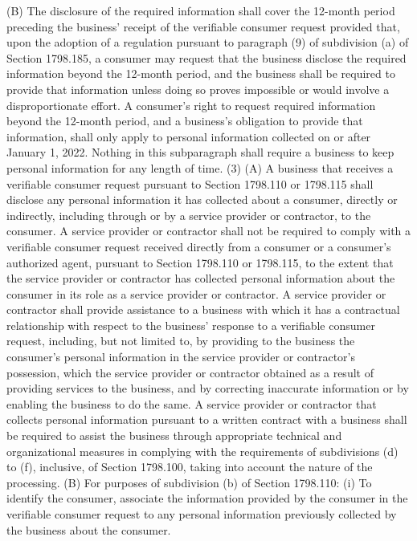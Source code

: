 (B) The disclosure of the required information shall cover the 12-month period preceding the business’ receipt of the verifiable consumer request provided that, upon the adoption of a regulation pursuant to paragraph (9) of subdivision (a) of Section 1798.185, a consumer may request that the business disclose the required information beyond the 12-month period, and the business shall be required to provide that information unless doing so proves impossible or would involve a disproportionate effort. A consumer’s right to request required information beyond the 12-month period, and a business’s obligation to provide that information, shall only apply to personal information collected on or after January 1, 2022. Nothing in this subparagraph shall require a business to keep personal information for any length of time.
(3) (A) A business that receives a verifiable consumer request pursuant to Section 1798.110 or 1798.115 shall disclose any personal information it has collected about a consumer, directly or indirectly, including through or by a service provider or contractor, to the consumer. A service provider or contractor shall not be required to comply with a verifiable consumer request received directly from a consumer or a consumer’s authorized agent, pursuant to Section 1798.110 or 1798.115, to the extent that the service provider or contractor has collected personal information about the consumer in its role as a service provider or contractor. A service provider or contractor shall provide assistance to a business with which it has a contractual relationship with respect to the business’ response to a verifiable consumer request, including, but not limited to, by providing to the business the consumer’s personal information in the service provider or contractor’s possession, which the service provider or contractor obtained as a result of providing services to the business, and by correcting inaccurate information or by enabling the business to do the same. A service provider or contractor that collects personal information pursuant to a written contract with a business shall be required to assist the business through appropriate technical and organizational measures in complying with the requirements of subdivisions (d) to (f), inclusive, of Section 1798.100, taking into account the nature of the processing.
(B) For purposes of subdivision (b) of Section 1798.110:
(i) To identify the consumer, associate the information provided by the consumer in the verifiable consumer request to any personal information previously collected by the business about the consumer.
